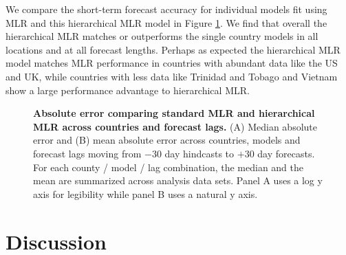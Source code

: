 \documentclass[10pt,letterpaper]{article}
\begin{document}
We compare the short-term forecast accuracy for individual models fit using MLR and this hierarchical MLR model in Figure \ref{fig:Fig7}.
We find that overall the hierarchical MLR matches or outperforms the single country models in all locations and at all forecast lengths.
Perhaps as expected the hierarchical MLR model matches MLR performance in countries with abundant data like the US and UK, while countries with less data like Trinidad and Tobago and Vietnam show a large performance advantage to hierarchical MLR.


\begin{figure}[h!]
	\centering
	\caption{\textbf{Absolute error comparing standard MLR and hierarchical MLR across countries and forecast lags.}
	(A) Median absolute error and (B) mean absolute error across countries, models and forecast lags moving from $-30$ day hindcasts to $+30$ day forecasts.
	For each county / model / lag combination, the median and the mean are summarized across analysis data sets.
	Panel A uses a log y axis for legibility while panel B uses a natural y axis.
	}
	\label{fig:Fig7}
\end{figure}


\section*{Discussion}

\end{document}
